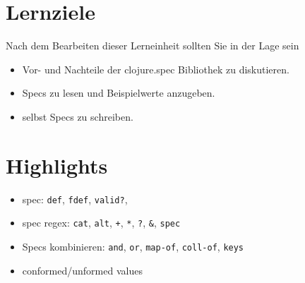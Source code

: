 \documentclass[11pt,a4paper]{article}
\theoremstyle{break}
\begin{document}
\section{Lernziele}

Nach dem Bearbeiten dieser Lerneinheit sollten Sie in der Lage sein

\begin{itemize}
    \item Vor- und Nachteile der clojure.spec Bibliothek zu diskutieren.
    \item Specs zu lesen und Beispielwerte anzugeben.
    \item selbst Specs zu schreiben.
\end{itemize}

\section{Highlights}

\begin{itemize}
    \item spec: \verb|def|, \verb|fdef|, \verb|valid?|,
    \item spec regex: \verb|cat|, \verb|alt|, \verb|+|, \verb|*|, \verb|?|, \verb|&|, \verb|spec|
    \item Specs kombinieren: \verb|and|, \verb|or|, \verb|map-of|, \verb|coll-of|, \verb|keys|
    \item conformed/unformed values
\end{itemize}
\end{document}
